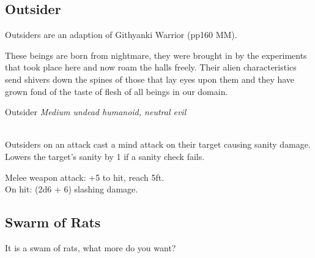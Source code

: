 \documentclass[10pt,twoside,twocolumn]{article}
\begin{document}
\subsection{Outsider}

Outsiders are an adaption of Githyanki Warrior (pp160 MM). \\

\begin{quotebox}
These beings are born from nightmare, they were brought in by the experiments that took place here and now roam the halls freely. Their alien characteristics send shivers down the spines of those that lay eyes upon them and they have grown fond of the taste of flesh of all beings in our domain.
\end{quotebox}

\begin{monsterbox}{Outsider}
	\textit{Medium undead humanoid, neutral evil}\\
	\hline
	\basics[%
	armorclass = 17,
	hitpoints  = 49 (9d8 + 9),
	speed      = 30 ft
	]
	\hline
	\stats[
	STR = 15 (+2),
	DEX = 14 (+2),
	CON = 12 (+1),
	INT = 13 (+1),
	WIS = 13 (+1),
	CHA = 10 (0)
	]
	\hline
	\details[%
	languages = {Otherworldly},
	]
	\hline \\[1mm]
	\begin{monsteraction}[Mindwarp]
		Outsiders on an attack cast a mind attack on their target causing sanity damage. Lowers the target's sanity by 1 if a sanity check fails.
	\end{monsteraction}
	\begin{monsteraction}[Greatsword.]
		Melee weapon attack: +5 to hit, reach 5ft. \\
		
		On hit: (2d6 + 6) slashing damage.
	\end{monsteraction}
\end{monsterbox}

\subsection{Swarm of Rats}

It is a swam of rats, what more do you want? \\
\end{document}
